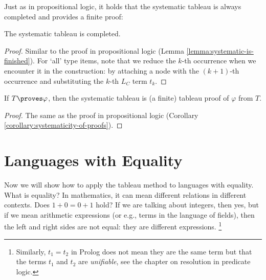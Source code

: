 Just as in propositional logic, it holds that the systematic tableau is always completed and provides a finite proof:

\begin{lemma}\label{lemma:systematic-is-finished-predicate}
    The systematic tableau is completed.
\end{lemma}
\begin{proof}
    Similar to the proof in propositional logic (Lemma \ref{lemma:systematic-is-finished}). For `all' type items, note that we reduce the $k$-th occurrence when we encounter it in the construction: by attaching a node with the $(k+1)$-th occurrence and substituting the $k$-th $L_C$ term $t_k$.
\end{proof}

\begin{corollary}\label{corollary:systematicity-of-proofs-predicate}
    If $T\proves\varphi$, then the systematic tableau is (a finite) tableau proof of $\varphi$ from $T$.
\end{corollary}
\begin{proof}
    The same as the proof in propositional logic (Corollary \ref{corollary:systematicity-of-proofs}).
\end{proof}


\section{Languages with Equality} \label{section:tableaux-equality}

Now we will show how to apply the tableau method to languages with equality. What is equality? In mathematics, it can mean different relations in different contexts. Does $1+0=0+1$ hold? If we are talking about integers, then yes, but if we mean arithmetic expressions (or e.g., terms in the language of fields), then the left and right sides are not equal: they are different expressions. \footnote{Similarly, $t_1=t_2$ in Prolog does not mean they are the same term but that the terms $t_1$ and $t_2$ are \emph{unifiable}, see the chapter on resolution in predicate logic.}

